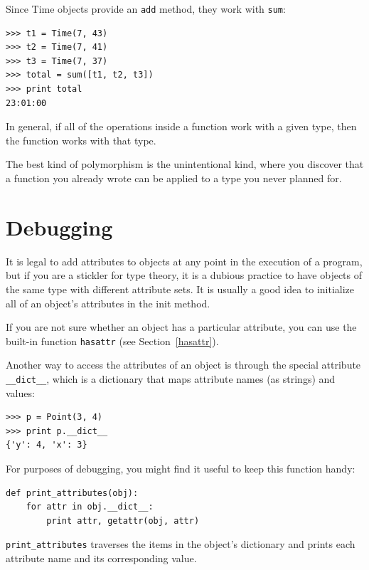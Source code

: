 \documentclass[10pt]{book}
\begin{document}
Since Time objects provide an {\tt add} method, they work
with {\tt sum}:

\begin{verbatim}
>>> t1 = Time(7, 43)
>>> t2 = Time(7, 41)
>>> t3 = Time(7, 37)
>>> total = sum([t1, t2, t3])
>>> print total
23:01:00
\end{verbatim}
%
In general, if all of the operations inside a function 
work with a given type, then the function works with that type.

The best kind of polymorphism is the unintentional kind, where
you discover that a function you already wrote can be
applied to a type you never planned for.


\section{Debugging}

It is legal to add attributes to objects at any point in the execution
of a program, but if you are a stickler for type theory, it is a
dubious practice to have objects of the same type with different
attribute sets.  It is usually a good idea to
initialize all of an object's attributes in the init method.

If you are not sure whether an object has a particular attribute, you
can use the built-in function {\tt hasattr} (see Section~\ref{hasattr}).

Another way to access the attributes of an object is through the
special attribute \verb"__dict__", which is a dictionary that maps
attribute names (as strings) and values:

\begin{verbatim}
>>> p = Point(3, 4)
>>> print p.__dict__
{'y': 4, 'x': 3}
\end{verbatim}
%
For purposes of debugging, you might find it useful to keep this
function handy:

\begin{verbatim}
def print_attributes(obj):
    for attr in obj.__dict__:
        print attr, getattr(obj, attr)
\end{verbatim}
%
\verb"print_attributes" traverses the items in the object's dictionary
and prints each attribute name and its corresponding value.
\end{document}
